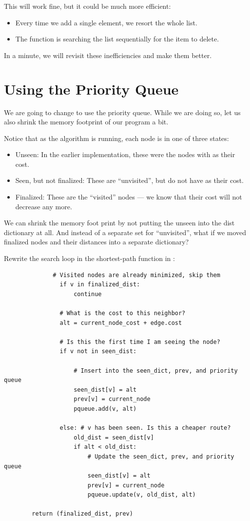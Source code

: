 This will work fine, but it could be much more efficient:
\begin{itemize}
\item Every time we add a single element, we resort the whole list.
\item The function  is searching the list sequentially for the item to delete.
\end{itemize}

In a minute, we will revisit these inefficiencies and make them better.

\section{Using the Priority Queue}

We are going to change  to use the priority
queue. While we are doing so, let us also shrink the memory
footprint of our program a bit.

Notice that as the algorithm is running, each node is in one of three states:
\begin{itemize}
\item Unseen: In the earlier implementation, these were the nodes with  as their cost.
\item Seen, but not finalized: These are ``unvisited'', but do not have  as their cost.
\item Finalized: These are the ``visited'' nodes --- we know that their cost will not decrease any more.
\end{itemize}

We can shrink the memory foot print by not putting the unseen into the
dist dictionary at all. And instead of a separate set for
``unvisited'', what if we moved finalized nodes and their distances
into a separate dictionary?

Rewrite the search loop in the shortest-path function in :

\begin{verbatim}
              # Visited nodes are already minimized, skip them
                if v in finalized_dist:
                    continue

                # What is the cost to this neighbor?
                alt = current_node_cost + edge.cost

                # Is this the first time I am seeing the node?
                if v not in seen_dist:

                    # Insert into the seen_dict, prev, and priority queue
                    seen_dist[v] = alt
                    prev[v] = current_node
                    pqueue.add(v, alt)

                else: # v has been seen. Is this a cheaper route?
                    old_dist = seen_dist[v]
                    if alt < old_dist:
                        # Update the seen_dict, prev, and priority queue
                        seen_dist[v] = alt
                        prev[v] = current_node
                        pqueue.update(v, old_dist, alt)

        return (finalized_dist, prev)
\end{verbatim}

